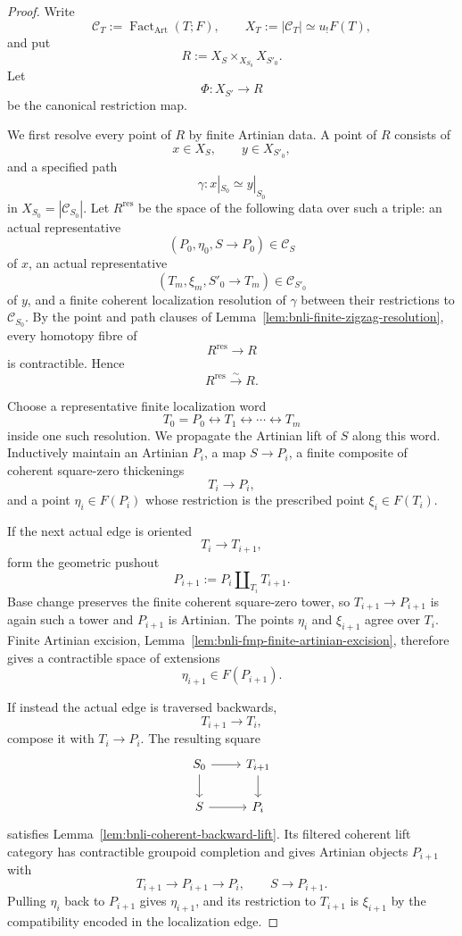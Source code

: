 \begin{proof}
Write
\[
    \mathcal C_T:=\operatorname{Fact}_{\mathrm{Art}}(T;F),
    \qquad
    X_T:=|\mathcal C_T|\simeq u_!F(T),
\]
and put
\[
    R:=X_S\times_{X_{S_0}}X_{S'_0}.
\]
Let
\[
    \Phi:X_{S'}\longrightarrow R
\]
be the canonical restriction map.

We first resolve every point of $R$ by finite Artinian data.  A point of $R$
consists of
\[
    x\in X_S,
    \qquad
    y\in X_{S'_0},
\]
and a specified path
\[
    \gamma:x|_{S_0}\simeq y|_{S_0}
\]
in $X_{S_0}=|\mathcal C_{S_0}|$.  Let $R^{\mathrm{res}}$ be the space of the
following data over such a triple: an actual representative
\[
    (P_0,\eta_0,S\to P_0)\in\mathcal C_S
\]
of $x$, an actual representative
\[
    (T_m,\xi_m,S'_0\to T_m)\in\mathcal C_{S'_0}
\]
of $y$, and a finite coherent localization resolution of $\gamma$ between
their restrictions to $\mathcal C_{S_0}$.  By the point and path clauses of
Lemma~\ref{lem:bnli-finite-zigzag-resolution}, every homotopy fibre of
\[
    R^{\mathrm{res}}\longrightarrow R
\]
is contractible.  Hence
\[
\boxed{
    R^{\mathrm{res}}\xrightarrow{\sim}R.}
\]

Choose a representative finite localization word
\[
    T_0=P_0
    \longleftrightarrow T_1
    \longleftrightarrow\cdots
    \longleftrightarrow T_m
\]
inside one such resolution.  We propagate the Artinian lift of $S$ along this
word.  Inductively maintain an Artinian $P_i$, a map $S\to P_i$, a finite
composite of coherent square-zero thickenings
\[
    T_i\longrightarrow P_i,
\]
and a point $\eta_i\in F(P_i)$ whose restriction is the prescribed point
$\xi_i\in F(T_i)$.

If the next actual edge is oriented
\[
    T_i\longrightarrow T_{i+1},
\]
form the geometric pushout
\[
\boxed{
    P_{i+1}:=P_i\amalg_{T_i}T_{i+1}.}
\]
Base change preserves the finite coherent square-zero tower, so
$T_{i+1}\to P_{i+1}$ is again such a tower and $P_{i+1}$ is Artinian.  The
points $\eta_i$ and $\xi_{i+1}$ agree over $T_i$.  Finite Artinian excision,
Lemma~\ref{lem:bnli-fmp-finite-artinian-excision}, therefore gives a
contractible space of extensions
\[
    \eta_{i+1}\in F(P_{i+1}).
\]

If instead the actual edge is traversed backwards,
\[
    T_{i+1}\longrightarrow T_i,
\]
compose it with $T_i\to P_i$.  The resulting square
\[
\begin{tikzcd}
S_0 \arrow[r] \arrow[d] & T_{i+1} \arrow[d]\\
S \arrow[r] & P_i
\end{tikzcd}
\]
satisfies Lemma~\ref{lem:bnli-coherent-backward-lift}.  Its filtered coherent
lift category has contractible groupoid completion and gives Artinian objects
$P_{i+1}$ with
\[
    T_{i+1}\longrightarrow P_{i+1}\longrightarrow P_i,
    \qquad
    S\longrightarrow P_{i+1}.
\]
Pulling $\eta_i$ back to $P_{i+1}$ gives $\eta_{i+1}$, and its restriction to
$T_{i+1}$ is $\xi_{i+1}$ by the compatibility encoded in the localization
edge.


\end{proof}
